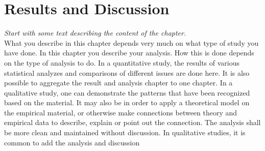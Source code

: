\section{Results and Discussion}
\emph{Start with some text describing the content of the chapter.}\\

\noindent What you describe in this chapter depends very much on what type of study you have done. In this chapter you describe your analysis. How this is done depends on the type of analysis to do. In a quantitative study, the results of various statistical analyzes and comparisons of different issues are done here. It is also possible to aggregate the result and analysis chapter to one chapter. In a qualitative study, one can demonstrate the patterns that have been  recognized based on the material. It may also be in order to apply a theoretical model on the empirical material, or otherwise make connections between theory and empirical data to describe, explain or point out the connection. The analysis shall be more clean and maintained without discussion. In qualitative studies, it is common to add the analysis and discussion 

